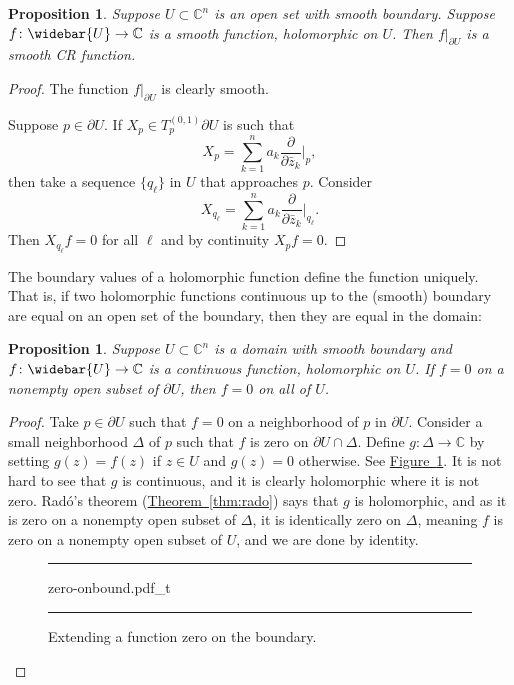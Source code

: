 \documentclass[12pt,openany]{book}
\newcommand{\C}{{\mathbb{C}}}
\theoremstyle{plain}
\newtheorem{prop}[thm]{Proposition}
\theoremstyle{remark}
\theoremstyle{definition}
\newenvironment{myfig}{%
\begin{figure}[h!t]
\noindent\rule{\textwidth}{0.5pt}\vspace{12pt}\par\centering}%
{\par\noindent\rule{\textwidth}{0.5pt}
\end{figure}}
\theoremstyle{exercise}
\theoremstyle{example}
\newcommand{\figureref}[1]{\hyperref[#1]{Figure~\ref*{#1}}}
\newcommand{\thmref}[1]{\hyperref[#1]{Theorem~\ref*{#1}}}
\begin{document}
\begin{prop} \label{prop:boundaryvaluesCR}
Suppose $U \subset \C^n$ is an open set with smooth boundary.  Suppose
$f \colon \widebar{U} \to \C$ is a smooth function, holomorphic on $U$.
Then $f|_{\partial U}$ is a smooth CR function.
\end{prop}

\begin{proof}
The function $f|_{\partial U}$ is clearly smooth.

Suppose $p \in \partial U$.
If $X_p \in T_p^{(0,1)} \partial U$ is such that
\begin{equation*}
X_p = \sum_{k=1}^n a_k \frac{\partial}{\partial \bar{z}_k} \Big|_p ,
\end{equation*}
then take a sequence $\{ q_\ell \}$ in $U$ that approaches $p$.  Consider
\begin{equation*}
X_{q_\ell} = \sum_{k=1}^n a_k \frac{\partial}{\partial \bar{z}_k}
\Big|_{q_\ell} .
\end{equation*}
Then $X_{q_\ell} f = 0$ for all $\ell$ and by continuity $X_p f = 0$.
\end{proof}

\pagebreak[2]
The boundary values of a holomorphic function define the function uniquely.
That is, if two holomorphic functions continuous up to the (smooth) boundary
are equal on an open set of the boundary, then they are equal in the domain:

\begin{prop} \label{prop:boundaryvaluesdeterminef}
Suppose $U \subset \C^n$ is a domain with smooth boundary and $f \colon
\widebar{U} \to \C$ is
a continuous function, holomorphic on $U$.  If $f=0$ on a nonempty open subset of $\partial
U$, then $f=0$ on all of $U$.
\end{prop}

\begin{proof}
Take $p \in \partial U$ such that $f=0$ on a neighborhood of $p$ in
$\partial U$.  Consider a small neighborhood $\Delta$ of $p$ such
that $f$ is zero on $\partial U \cap \Delta$.  Define $g \colon \Delta \to
\C$ by setting $g(z) = f(z)$ if $z \in U$ and $g(z) = 0$ otherwise.
See \figureref{fig:zero-onbound}.
It is not hard to see that $g$ is continuous, and it is clearly holomorphic
where it is not zero.  Rad{\'o}'s theorem
(\thmref{thm:rado}) says that $g$ is holomorphic, and as it is zero on a
nonempty open subset of $\Delta$, it is identically zero on $\Delta$,
meaning $f$ is zero on a nonempty open subset of $U$, and we are done by
identity.

\begin{myfig}
{zero-onbound.pdf_t}
\caption{Extending a function zero on the boundary.\label{fig:zero-onbound}}
\end{myfig}
\end{proof}
\end{document}
